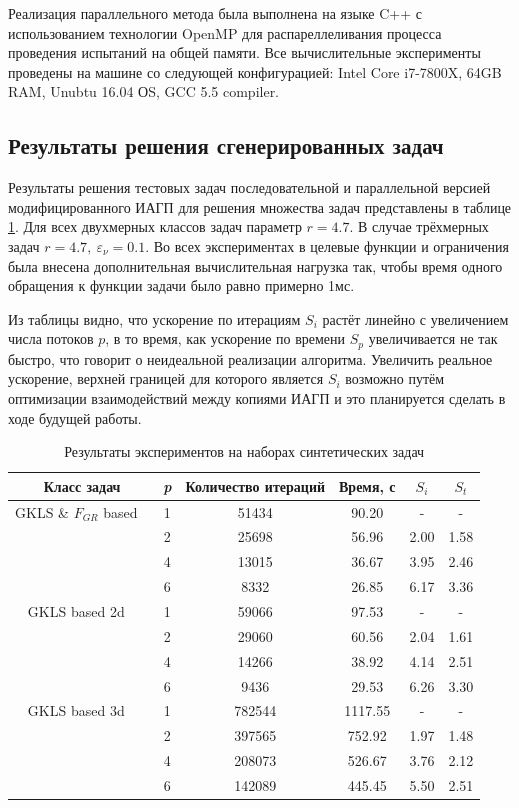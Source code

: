 \documentclass[11pt, oneside, a4paper]{article}
\begin{document}
Реализация параллельного метода была выполнена на языке C++ с использованием технологии OpenMP
для распареллеливания процесса проведения испытаний на общей памяти. Все вычислительные
эксперименты проведены на машине со следующей конфигурацией: Intel Core i7-7800X, 64GB RAM, Unubtu 16.04 ОS, GCC 5.5 compiler.

\subsection{Результаты решения сгенерированных задач}

Результаты решения тестовых задач последовательной и параллельной версией модифицированного ИАГП
для решения множества задач представлены в таблице \ref{tab:speedup}. Для всех двухмерных классов задач параметр \(r=4.7\).
В случае трёхмерных задач \(r=4.7,\: \varepsilon_\nu=0.1\).
Во всех экспериментах в целевые функции и ограничения была внесена дополнительная вычислительная нагрузка так,
чтобы время одного обращения к функции задачи было равно примерно 1мс.

Из таблицы видно, что ускорение по итерациям \(S_i\) растёт линейно с увеличением числа потоков \(p\),
в то время, как ускорение по времени \(S_p\) увеличивается не так быстро, что говорит о неидеальной
реализации алгоритма. Увеличить реальное ускорение, верхней границей для которого является
\(S_i\) возможно путём оптимизации взаимодействий между копиями ИАГП и это планируется сделать в ходе будущей работы.

\begin{table}
  \centering
  \caption{Результаты экспериментов на наборах синтетических задач}
  \label{tab:speedup}
  \begin{tabular}{c|c|cccc}
    Класс задач & \textit{p} & Количество итераций & Время, с & \(S_i\) & \(S_t\)   \\
    \hline
    GKLS \& \(F_{GR}\) based \
      & 1 & 51434 & 90.20 & -    & - \\
      & 2 & 25698 & 56.96 & 2.00 & 1.58 \\
      & 4 & 13015 & 36.67 & 3.95 & 2.46 \\
      & 6 & 8332  & 26.85 & 6.17 & 3.36 \\
    \hline
    GKLS based 2d \
      & 1 & 59066 & 97.53 & -    & - \\
      & 2 & 29060 & 60.56 & 2.04 & 1.61 \\
      & 4 & 14266 & 38.92 & 4.14 & 2.51 \\
      & 6 & 9436  & 29.53 & 6.26 & 3.30 \\
    \hline
    GKLS based 3d \
      & 1 & 782544 & 1117.55 & -    & - \\
      & 2 & 397565 & 752.92  & 1.97 & 1.48 \\
      & 4 & 208073 & 526.67  & 3.76 & 2.12 \\
      & 6 & 142089 & 445.45  & 5.50 & 2.51 \\
    \hline
  \end{tabular}
\end{table}
\end{document}
